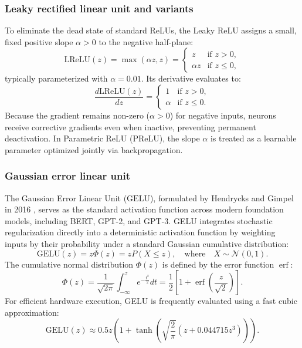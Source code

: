 \documentclass[../../main.tex]{subfiles}
\begin{document}
\subsubsection{Leaky rectified linear unit and variants}

To eliminate the dead state of standard ReLUs, the Leaky ReLU assigns a small, fixed positive slope $\alpha > 0$ to the negative half-plane:
\begin{equation}
\text{LReLU}(z) = \max(\alpha z, z) = \begin{cases} 
z & \text{if } z > 0, \\ 
\alpha z & \text{if } z \le 0, 
\end{cases}
\end{equation}
typically parameterized with $\alpha = 0.01$. Its derivative evaluates to:
\begin{equation}
\frac{d\text{LReLU}(z)}{dz} = \begin{cases} 
1 & \text{if } z > 0, \\ 
\alpha & \text{if } z \le 0. 
\end{cases}
\end{equation}
Because the gradient remains non-zero ($\alpha > 0$) for negative inputs, neurons receive corrective gradients even when inactive, preventing permanent deactivation. In Parametric ReLU (PReLU), the slope $\alpha$ is treated as a learnable parameter optimized jointly via backpropagation.

\subsubsection{Gaussian error linear unit}

The Gaussian Error Linear Unit ($\text{GELU}$), formulated by Hendrycks and Gimpel in 2016 \citep{hendrycks2016gelu}, serves as the standard activation function across modern foundation models, including BERT, GPT-2, and GPT-3. GELU integrates stochastic regularization directly into a deterministic activation function by weighting inputs by their probability under a standard Gaussian cumulative distribution:
\begin{equation}
\text{GELU}(z) = z \Phi(z) = z P(X \le z), \quad \text{where} \quad X \sim \mathcal{N}(0, 1).
\end{equation}
The cumulative normal distribution $\Phi(z)$ is defined by the error function $\operatorname{erf}$:
\begin{equation}
\Phi(z) = \frac{1}{\sqrt{2\pi}} \int_{-\infty}^z e^{-\frac{t^2}{2}} dt = \frac{1}{2} \left[ 1 + \operatorname{erf}\left(\frac{z}{\sqrt{2}}\right) \right].
\end{equation}
For efficient hardware execution, GELU is frequently evaluated using a fast cubic approximation:
\begin{equation}
\text{GELU}(z) \approx 0.5z \left( 1 + \tanh\left( \sqrt{\frac{2}{\pi}} \left( z + 0.044715 z^3 \right) \right) \right).
\end{equation}
\end{document}
